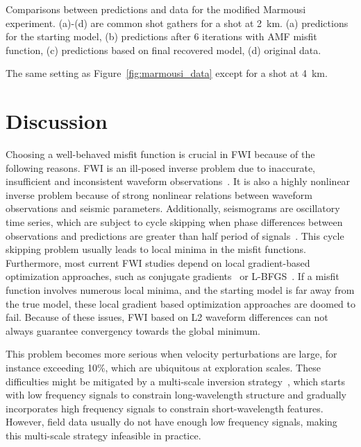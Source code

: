 {\label{fig:marmousi_data} Comparisons between predictions and data for the modified Marmousi experiment. 
(a)-(d) are common shot gathers for a shot at 2~km. (a) predictions 
for the starting model, (b) predictions after 6 iterations with AMF misfit function, 
(c) predictions based on final recovered model, (d) original data.}

{\label{fig:marmousi_data1} 
The same setting as Figure~\ref{fig:marmousi_data} except for a shot at 4~km.} 

\section{Discussion}
Choosing a well-behaved misfit function is crucial in FWI because of the following reasons.
FWI is an ill-posed inverse problem due to inaccurate, insufficient 
and inconsistent waveform observations~\citep{JacksonDD1972}. It is also 
a highly nonlinear inverse problem because of strong nonlinear relations between 
waveform observations and seismic parameters. Additionally, seismograms are oscillatory 
time series, which are subject to cycle skipping when phase differences 
between observations and predictions are greater than half period of signals~\citep{fwi2009}. 
This cycle skipping problem usually leads to local minima in the misfit functions. 
Furthermore, most current FWI studies depend on local 
gradient-based optimization approaches, such as conjugate gradients~\citep{Fletcher1964} 
or L-BFGS~\citep{Nocedal1980}. If a misfit function involves numerous 
local minima, and the starting model is far away from the true model, 
these local gradient based optimization approaches are doomed to fail. Because of these issues, 
FWI based on L2 waveform differences can not always guarantee 
convergency towards the global minimum.

This problem becomes more serious when velocity perturbations are large, 
for instance exceeding 10\%, which are ubiquitous at exploration scales. These 
difficulties might be mitigated by a multi-scale inversion strategy~\citep{Bunks1995, SirguePratt2004}, 
which starts with low frequency signals to constrain long-wavelength structure and gradually incorporates high 
frequency signals to constrain short-wavelength features. However, field data 
usually do not have enough low frequency signals, making this multi-scale strategy 
infeasible in practice. 


